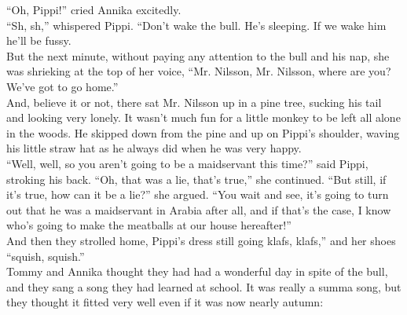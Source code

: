 \documentclass{standard}
\begin{document}
“Oh, Pippi!” cried Annika excitedly.\\

“Sh, sh,” whispered Pippi. “Don’t wake the bull. He’s sleeping. If we wake him he’ll be fussy.\\

But the next minute, without paying any attention to the bull and his nap, she was shrieking at the top of her voice, “Mr. Nilsson, Mr. Nilsson, where are you? We’ve got to go home.”\\

And, believe it or not, there sat Mr. Nilsson up in a pine tree, sucking his tail and looking very lonely. It wasn’t much fun for a little monkey to be left all alone in the woods. He skipped down from the pine and up on Pippi’s shoulder, waving his little straw hat as he always did when he was very happy.\\

“Well, well, so you aren’t going to be a maidservant this time?” said Pippi, stroking his back. “Oh, that was a lie, that’s true,” she continued. “But still, if it’s true, how can it be a lie?” she argued. “You wait and see, it’s going to turn out that he was a maidservant in Arabia after all, and if that’s the case, I know who’s going to make the meatballs at our house hereafter!”\\

And then they strolled home, Pippi’s dress still going klafs, klafs,” and her shoes “squish, squish.”\\

Tommy and Annika thought they had had a wonderful day in spite of the bull, and they sang a song they had learned at school. It was really a summa song, but they thought it fitted very well even if it was now nearly autumn:
\end{document}

